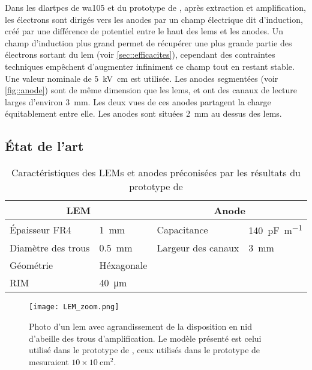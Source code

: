       Dans les \glspl{dlartpc} de \gls{wa105} et du prototype de \threeL{}, après extraction et amplification, les électrons sont dirigés vers les anodes par un champ électrique dit d'induction, créé par une différence de potentiel entre le haut des \glspl{lem} et les anodes. Un champ d'induction plus grand permet de récupérer une plus grande partie des électrons sortant du \gls{lem} (voir \autoref{sec::efficacites}), cependant des contraintes techniques empêchent d'augmenter infiniment ce champ tout en restant stable. Une valeur nominale de \SI{5}{\kilo\volt\centi\meter} est utilisée. Les anodes segmentées (voir \autoref{fig::anode}) sont de même dimension que les \glspl{lem}, et ont des canaux de lecture larges d'environ \SI{3}{\milli\meter}. Les deux vues de ces anodes partagent la charge équitablement entre elle. Les anodes sont situées \SI{2}{\milli\meter} au dessus des \glspl{lem}.

    \subsection{État de l'art}\label{sec::state_of_the_art}

      \begin{table}[]
        \centering
        \begin{tabular}{|ll||ll|}
          \hline
          \multicolumn{2}{|c||}{LEM} & \multicolumn{2}{c|}{Anode} \\ \hline \hline
          Épaisseur FR4 & \SI{1}{\milli\meter} & Capacitance & \SI{140}{\pico\farad\per\meter} \\
          Diamètre des trous & \SI{0.5}{\milli\meter} & Largeur des canaux & \SI{3}{\milli\meter} \\
          Géométrie & Héxagonale &  &  \\
          RIM & \SI{40}{\micro\meter} &  &  \\ \hline
        \end{tabular}
        \caption[Caractéristiques des LEMs et anodes utilisé dans le \threeL{}]{\label{tab::lem_anode}Caractéristiques des LEMs et anodes préconisées par les résultats du prototype de \threeL{}}
      \end{table}

      \begin{figure}[!htb]
        \centering
        \texttt{[image: LEM\_zoom.png]} 
        \caption[Photo d'un amplificateur d'électron]{Photo d'un \gls{lem} avec agrandissement de la disposition en nid d'abeille des trous d'amplification. Le modèle présenté est celui utilisé dans le prototype de \TOO{}, ceux utilisés dans le prototype de \threeL{} mesuraient $10\times\SI{10}{\centi\meter\squared}$.}
        \label{fig::lem}
      \end{figure}

